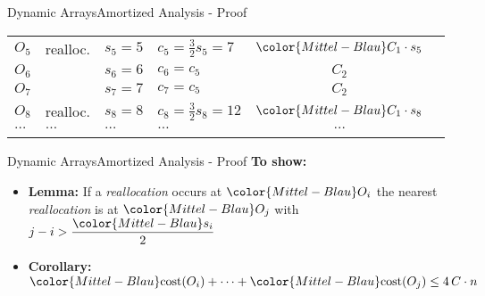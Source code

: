 \begin{frame}{Dynamic Arrays}{Amortized Analysis - Proof}
\begin{table}[!h]
\begin{tabular}{|l|l|l|l|c|@{}l}
      \cmidrule{1-5}
      $O_5$ & {\color{Mittel-Blau}realloc.} &
      $s_5 = 5$ & {\color{Mittel-Blau}$c_5 = \frac{3}{2} s_5 = 7$} &
      ${\color{Mittel-Blau}C_1 \cdot s_5}$ &
      \raisebox{-0.5em}{\multirow{3}{*}{%
        $\left.\begin{array}{@{}l@{}}\\[3.25em]\end{array}\right\rbrace
        \begin{array}{@{}l@{}}
          \text{distance}\\
          3 \geq \left\lfloor\dfrac{{\color{Mittel-Blau}s_5}}{2}\right\rfloor
        \end{array}$%
      }}\\
      $O_6$ & {} & $s_6 = 6$ & $c_6 = c_5$ & $C_2$\\
      $O_7$ & {} & $s_7 = 7$ & $c_7 = c_5$ & $C_2$\\
      \cmidrule{1-5}
      $O_8$ & {\color{Mittel-Blau}realloc.} &
      $s_8 = 8$ & {\color{Mittel-Blau}$c_8 = \frac{3}{2} s_8 = 12$} &
      ${\color{Mittel-Blau}C_1 \cdot s_8}$\\
      $\dots$ & $\dots$ & $\dots$ & $\dots$ & $\dots$\\
      \addlinespace[0.5\aboverulesep]\cmidrule[\heavyrulewidth]{1-5}
    \end{tabular}
  \end{table}
\end{frame}


\begin{frame}{Dynamic Arrays}{Amortized Analysis - Proof}
  \textbf{To show:}
  \begin{itemize}
    \item
      \textbf{Lemma:}
      If a \textit{reallocation} occurs at ${\color{Mittel-Blau}O_i}$
      the nearest \textit{reallocation} is at ${\color{Mittel-Blau}O_j}$
      with $j - i > \dfrac{{\color{Mittel-Blau}s_i}}{2}$
    \item
      \textbf{Corollary:}
      ${\color{Mittel-Blau}\mathrm{cost}(O_i)}+\dots
        +{\color{Mittel-Blau}\mathrm{cost}(O_j)} \leq 4 \, C \cdot n$
  \end{itemize}
\end{frame}


